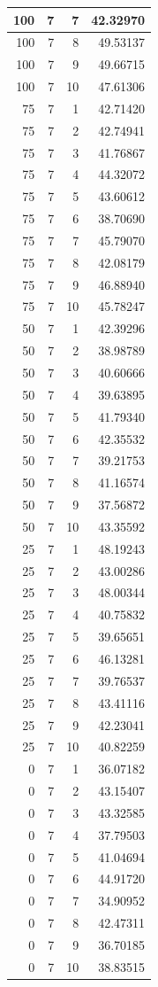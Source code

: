 \documentclass[
]{article}
\begin{document}
\begin{table}
\begin{tabular}[t]{r|r|r|r}
\hline
100 & 7 & 7 & 42.32970\\
\hline
100 & 7 & 8 & 49.53137\\
\hline
100 & 7 & 9 & 49.66715\\
\hline
100 & 7 & 10 & 47.61306\\
\hline
75 & 7 & 1 & 42.71420\\
\hline
75 & 7 & 2 & 42.74941\\
\hline
75 & 7 & 3 & 41.76867\\
\hline
75 & 7 & 4 & 44.32072\\
\hline
75 & 7 & 5 & 43.60612\\
\hline
75 & 7 & 6 & 38.70690\\
\hline
75 & 7 & 7 & 45.79070\\
\hline
75 & 7 & 8 & 42.08179\\
\hline
75 & 7 & 9 & 46.88940\\
\hline
75 & 7 & 10 & 45.78247\\
\hline
50 & 7 & 1 & 42.39296\\
\hline
50 & 7 & 2 & 38.98789\\
\hline
50 & 7 & 3 & 40.60666\\
\hline
50 & 7 & 4 & 39.63895\\
\hline
50 & 7 & 5 & 41.79340\\
\hline
50 & 7 & 6 & 42.35532\\
\hline
50 & 7 & 7 & 39.21753\\
\hline
50 & 7 & 8 & 41.16574\\
\hline
50 & 7 & 9 & 37.56872\\
\hline
50 & 7 & 10 & 43.35592\\
\hline
25 & 7 & 1 & 48.19243\\
\hline
25 & 7 & 2 & 43.00286\\
\hline
25 & 7 & 3 & 48.00344\\
\hline
25 & 7 & 4 & 40.75832\\
\hline
25 & 7 & 5 & 39.65651\\
\hline
25 & 7 & 6 & 46.13281\\
\hline
25 & 7 & 7 & 39.76537\\
\hline
25 & 7 & 8 & 43.41116\\
\hline
25 & 7 & 9 & 42.23041\\
\hline
25 & 7 & 10 & 40.82259\\
\hline
0 & 7 & 1 & 36.07182\\
\hline
0 & 7 & 2 & 43.15407\\
\hline
0 & 7 & 3 & 43.32585\\
\hline
0 & 7 & 4 & 37.79503\\
\hline
0 & 7 & 5 & 41.04694\\
\hline
0 & 7 & 6 & 44.91720\\
\hline
0 & 7 & 7 & 34.90952\\
\hline
0 & 7 & 8 & 42.47311\\
\hline
0 & 7 & 9 & 36.70185\\
\hline
0 & 7 & 10 & 38.83515\\
\hline
\end{tabular}
\end{table}
\end{document}
